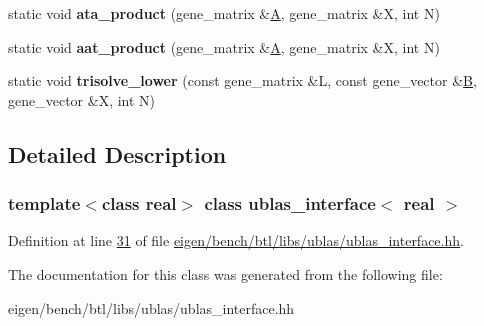 \begin{DoxyCompactItemize}
static void {\bfseries ata\+\_\+product} (gene\+\_\+matrix \&\hyperlink{group___core___module_class_eigen_1_1_matrix}{A}, gene\+\_\+matrix \&X, int N)
\item 
\mbox{\label{classublas__interface_ac0b4af8032156a1d7e37e3d19220b5e8}} 
static void {\bfseries aat\+\_\+product} (gene\+\_\+matrix \&\hyperlink{group___core___module_class_eigen_1_1_matrix}{A}, gene\+\_\+matrix \&X, int N)
\item 
\mbox{\label{classublas__interface_aff37a09a043018d1eb13de586b070598}} 
static void {\bfseries trisolve\+\_\+lower} (const gene\+\_\+matrix \&L, const gene\+\_\+vector \&\hyperlink{group___core___module_class_eigen_1_1_matrix}{B}, gene\+\_\+vector \&X, int N)
\end{DoxyCompactItemize}


\subsection{Detailed Description}
\subsubsection*{template$<$class real$>$\newline
class ublas\+\_\+interface$<$ real $>$}



Definition at line \hyperlink{eigen_2bench_2btl_2libs_2ublas_2ublas__interface_8hh_source_l00031}{31} of file \hyperlink{eigen_2bench_2btl_2libs_2ublas_2ublas__interface_8hh_source}{eigen/bench/btl/libs/ublas/ublas\+\_\+interface.\+hh}.



The documentation for this class was generated from the following file\+:\begin{DoxyCompactItemize}
\item 
eigen/bench/btl/libs/ublas/ublas\+\_\+interface.\+hh\end{DoxyCompactItemize}
